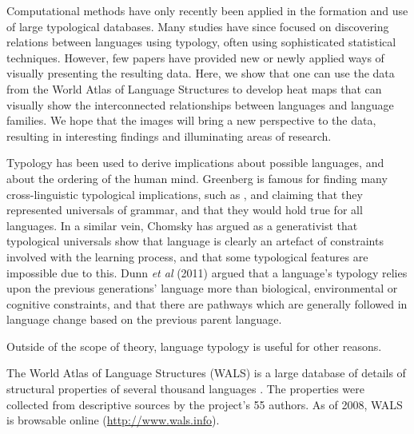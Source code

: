\documentclass[11pt]{article}
\begin{document}
 Computational methods have only recently been applied in the formation and use of large typological databases. Many studies have since focused on discovering relations between languages using typology, often using sophisticated statistical techniques. However, few papers have provided new or newly applied ways of visually presenting the resulting data. Here, we show that one can use the data from the World Atlas of Language Structures \cite{wals-2011} to develop heat maps that can visually show the interconnected relationships between languages and language families. We hope that the images will bring a new perspective to the data, resulting in interesting findings and illuminating areas of research.

Typology has been used to derive implications about possible languages, and about the ordering of the human mind. Greenberg  is famous for finding many cross-linguistic typological implications, such as %
, and claiming that they represented universals of grammar, and that they would hold true for all languages. In a similar vein, Chomsky %
has argued as a generativist that typological universals show that language is clearly an artefact of constraints involved with the learning process, and that some typological features are impossible due to this. Dunn {\it et al} (2011) %
argued that a language's typology relies upon the previous generations' language more than biological, environmental or cognitive constraints, and that there are pathways which are generally followed in language change based on the previous parent language. 

Outside of the scope of theory, language typology is useful for other reasons. %

The World Atlas of Language Structures (WALS) is a large database of details of structural properties of several thousand languages \cite{wals-2011}. The properties were collected from descriptive sources by the project's 55 authors. As of 2008, WALS is browsable online (\url{http://www.wals.info}).
\end{document}
